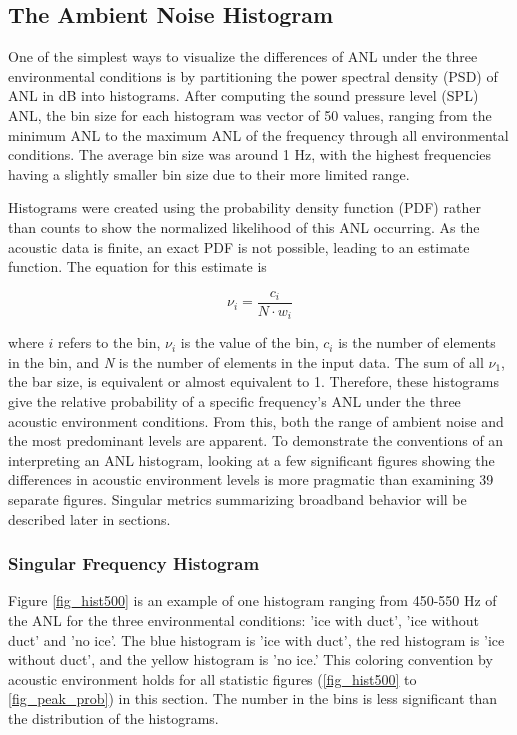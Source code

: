 \subsection{The Ambient Noise Histogram} \label{sec_hist}
One of the simplest ways to visualize the differences of ANL under the three environmental conditions is by partitioning the power spectral density (PSD) of ANL in dB into histograms. After computing the sound pressure level (SPL) ANL, the bin size for each histogram was vector of 50 values, ranging from the minimum ANL to the maximum ANL of the frequency through all environmental conditions. The average bin size was around 1 Hz, with the highest frequencies having a slightly smaller bin size due to their more limited range. %

Histograms were created using the probability density function (PDF) rather than counts to show the normalized likelihood of this ANL occurring. As the acoustic data is finite, an exact PDF is not possible, leading to an estimate function. The equation for this estimate is

\begin{equation} \label{eq:hist_pdf}
 \nu _{i}=\frac{c_{i}}{N \cdot w_{i}} 
\end{equation}

where $i$ refers to the bin, $\nu _{i}$ is the value of the bin, $c_{i}$ is the number of elements in the bin, and \textit{N} is the number of elements in the input data. The sum of all $\nu_{1}$, the bar size, is equivalent or almost equivalent to 1. Therefore, these histograms give the relative probability  of a specific frequency's ANL under the three acoustic environment conditions. From this, both the range of ambient noise and the most predominant levels are apparent. To demonstrate the conventions of an interpreting an ANL histogram, looking at a few significant figures showing the differences in acoustic environment levels is more pragmatic than examining 39 separate figures. Singular metrics summarizing broadband behavior will be described later in sections.

\subsubsection{Singular Frequency Histogram}
Figure \ref{fig_hist500} is an example of one histogram ranging from 450-550 Hz of the ANL for the three environmental conditions: 'ice with duct',  'ice without duct' and 'no ice'.  The blue histogram is 'ice with duct', the red histogram is 'ice without duct', and the yellow histogram is 'no ice.'  This coloring convention by acoustic environment holds for all statistic figures (\autoref{fig_hist500} to \autoref{fig_peak_prob}) in this section. The number in the bins is less significant than the distribution of the histograms. 

